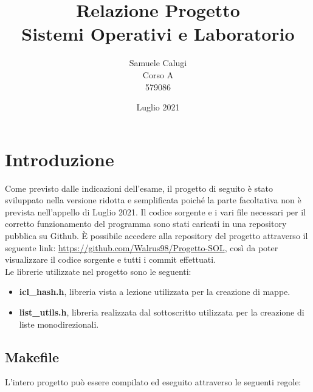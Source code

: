 \documentclass{article}
\title{Relazione Progetto \\ Sistemi Operativi e Laboratorio}
\date{Luglio 2021}
\author{Samuele Calugi\\ Corso A \\ 579086}
\begin{document}
\maketitle
\tableofcontents

\section{Introduzione}
Come previsto dalle indicazioni dell'esame, il progetto di seguito è stato sviluppato nella versione ridotta e semplificata poiché la parte facoltativa non è 
prevista nell'appello di Luglio 2021. Il codice sorgente e i vari file necessari per il corretto funzionamento del programma sono stati caricati in una repository
pubblica su Github. È possibile accedere alla repository del progetto attraverso il seguente link: \url{https://github.com/Walrus98/Progetto-SOL}, così da poter 
visualizzare il codice sorgente e tutti i commit effettuati. \\ Le librerie utilizzate nel progetto sono le seguenti:
\begin{itemize}
    \itemsep 0em 
    \item \textbf{icl\_hash.h}, libreria vista a lezione utilizzata per la creazione di mappe.
    \item \textbf{list\_utils.h}, libreria realizzata dal sottoscritto utilizzata per la creazione di liste monodirezionali.
\end{itemize}

\subsection{Makefile}
L'intero progetto può essere compilato ed eseguito attraverso le seguenti regole:
\end{document}
